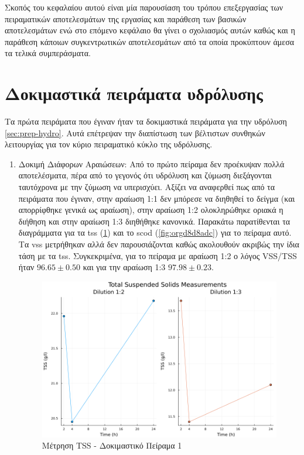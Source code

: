 \documentclass[11pt]{report}
\begin{document}
Σκοπός του κεφαλαίου αυτού είναι μία παρουσίαση του τρόπου επεξεργασίας των πειραματικών αποτελεσμάτων της εργασίας και παράθεση των βασικών αποτελεσμάτων ενώ στο επόμενο κεφάλαιο θα γίνει ο σχολιασμός αυτών καθώς και η παράθεση κάποιων συγκεντρωτικών αποτελεσμάτων από τα οποία προκύπτουν άμεσα τα τελικά συμπεράσματα.

\section{Δοκιμαστικά πειράματα υδρόλυσης}
\label{sec:org68b9996}
Τα πρώτα πειράματα που έγιναν ήταν τα δοκιμαστικά πειράματα για την υδρόλυση \autoref{sec:prep-hydro}. Αυτά επέτρεψαν την διαπίστωση των βέλτιστων συνθηκών λειτουργίας για τον κύριο πειραματικό κύκλο της υδρόλυσης.

\begin{enumerate}
\item Δοκιμή Διάφορων Αραιώσεων:
\label{sec:org9fb1c57}
Από το πρώτο πείραμα δεν προέκυψαν πολλά αποτελέσματα, πέρα από το γεγονός ότι υδρόλυση και ζύμωση διεξάγονται ταυτόχρονα με την ζύμωση να υπερισχύει. Αξίζει να αναφερθεί πως από τα πειράματα που έγιναν, στην αραίωση 1:1 δεν μπόρεσε να διηθηθεί το δείγμα (και απορρίφθηκε γενικά ως αραίωση), στην αραίωση 1:2 ολοκληρώθηκε οριακά η διήθηση και στην αραίωση 1:3 διηθήθηκε κανονικά. Παρακάτω παρατίθενται τα διαγράμματα για τα \acrfull{tss} (\ref{fig:orgd2ffc21}) και το \acrfull{scod} (\ref{fig:orgd8d8adc}) για το πείραμα αυτό. Τα \acrfull{vss} μετρήθηκαν αλλά δεν παρουσιάζονται καθώς ακολουθούν ακριβώς την ίδια τάση με τα \acrfull{tss}. Συγκεκριμένα, για το πείραμα με αραίωση 1:2 ο λόγος VSS/TSS ήταν \(96.65 \pm 0.50\) και για την αραίωση 1:3 \(97.98 \pm 0.23\). 

\begin{figure}[htbp]
\centering
\includegraphics[width=.9\linewidth]{../plots/10_10/tss_plot.png}
\caption{\label{fig:orgd2ffc21}Μέτρηση TSS - Δοκιμαστικό Πείραμα 1}
\end{figure}


\end{enumerate}
\end{document}
